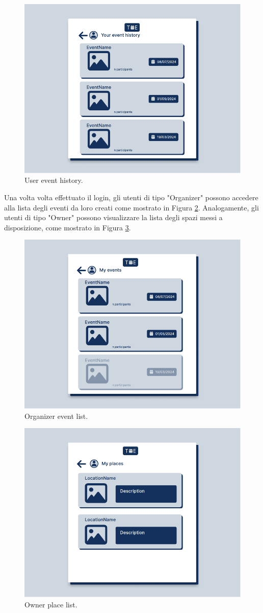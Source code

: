 \documentclass[9pt]{extarticle}
\begin{document}
\begin{figure}[!htb]
	\centering
	\includegraphics[width=.7\linewidth]{./images/userEventHistory.pdf}
	\caption{User event history.}
	\label{fig:userEventHistory}
\end{figure}

Una volta volta effettuato il login, gli utenti di tipo "Organizer" possono accedere alla lista degli eventi da loro creati come mostrato in Figura \ref{fig:OrganizerEventStats}. Analogamente, gli utenti di tipo "Owner" possono visualizzare la lista degli spazi messi a disposizione, come mostrato in Figura \ref{fig:OwnerPlaceStats}.

\begin{figure}[!htb]
	\centering
	\includegraphics[width=.7\linewidth]{./images/OrganizerEventStats.pdf}
	\caption{Organizer event list.}
	\label{fig:OrganizerEventStats}
\end{figure}

\begin{figure}[!htb]
	\centering
	\includegraphics[width=.7\linewidth]{./images/OwnerPlaceStats.pdf}
	\caption{Owner place list.}
	\label{fig:OwnerPlaceStats}
\end{figure}
\end{document}
